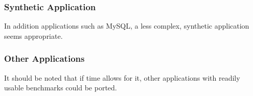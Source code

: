 \documentclass{article}
\begin{document}
\subsubsection{Synthetic Application}

In addition applications such as MySQL, a less complex, synthetic application seems appropriate.

\subsubsection{Other Applications}

It should be noted that if time allows for it, other applications with readily usable benchmarks could be ported.

\clearpage

\printglossaries

\clearpage


\end{document}

